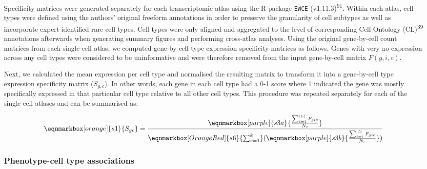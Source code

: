\documentclass[
]{article}
\begin{document}
Specificity matrices were generated separately for each transcriptomic
atlas using the R package \texttt{EWCE} (v1.11.3)\textsuperscript{91}.
Within each atlas, cell types were defined using the authors' original
freeform annotations in order to preserve the granularity of cell
subtypes as well as incorporate expert-identified rare cell types. Cell
types were only aligned and aggregated to the level of corresponding
Cell Ontology (CL)\textsuperscript{39} annotations afterwards when
generating summary figures and performing cross-atlas analyses. Using
the original gene-by-cell count matrices from each single-cell atlas, we
computed gene-by-cell type expression specificity matrices as follows.
Genes with very no expression across any cell types were considered to
be uninformative and were therefore removed from the input gene-by-cell
matrix \(F(g,i,c)\).

Next, we calculated the mean expression per cell type and normalised the
resulting matrix to transform it into a gene-by-cell type expression
specificity matrix (\(S_{g,c}\)). In other words, each gene in each cell
type had a 0-1 score where 1 indicated the gene was mostly specifically
expressed in that particular cell type relative to all other cell types.
This procedure was repeated separately for each of the single-cell
atlases and can be summarised as:

\hfill\break

\begin{equation*}
  \eqnmarkbox[orange]{s1}{S_{gc}}
  =
  \frac{
    \eqnmarkbox[purple]{s3a}{
      \frac{
        \sum_{i=1}^{|L|} F_{gic}
      }{
        N_c  
      }
    } 
  }{
   \eqnmarkbox[OrangeRed]{s6}{\sum_{r=1}^{k}}(
     \eqnmarkbox[purple]{s3b}{
      \frac{
        \sum_{i=1}^{|L|} F_{gic}
      }{
        N_c  
      }
    } 
   ) 
  }
\end{equation*}

\hfill\break

\subsubsection{Phenotype-cell type
associations}\label{phenotype-cell-type-associations-1}
\end{document}
